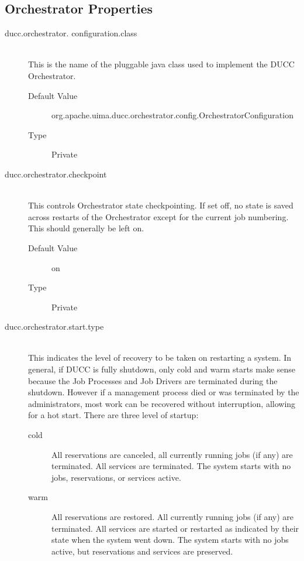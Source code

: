 \subsection{Orchestrator Properties}
    \begin{description}
      \item[ducc.orchestrator. configuration.class] \hfill \\
        This is the name of the pluggable java class used to implement the DUCC Orchestrator. 
        \begin{description}
          \item[Default Value] org.apache.uima.ducc.orchestrator.config.OrchestratorConfiguration 
          \item[Type] Private
        \end{description} 
        
      \item[ducc.orchestrator.checkpoint] \hfill \\
        This controls Orchestrator state checkpointing. If set off, no state is saved across restarts of 
        the Orchestrator except for the current job numbering. This should generally be left on. 
        \begin{description}          
          \item[Default Value] on 
          \item[Type] Private 
        \end{description}
        
      \item[ducc.orchestrator.start.type] \hfill \\
        This indicates the level of recovery to be taken on restarting a system. In general, if DUCC 
        is fully shutdown, only cold and warm starts make sense because the Job Processes and 
        Job Drivers are terminated during the shutdown. However if a management process died 
        or was terminated by the administrators, most work can be recovered without interruption, 
        allowing for a hot start. There are three level of startup: 
        \begin{description}
            \item[cold] All reservations are canceled, all currently running jobs (if any) are
              terminated. All services are terminated. The system starts with no jobs, reservations, or
              services active.

            \item[warm] All reservations are restored. All currently running jobs (if any) are 
              terminated. All services are started or restarted as indicated by their state when 
              the system went down. The system starts with no jobs active, but reservations and 
              services are preserved. 


\end{description}
\end{description}
